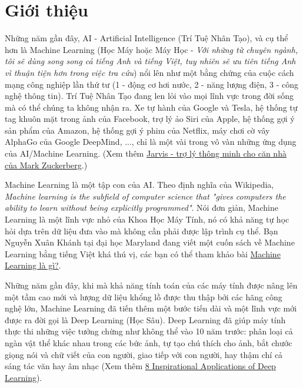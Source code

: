 
\chapter{Giới thiệu}
\label{cha:introduce}



Những năm gần đây, AI - Artificial Intelligence (Trí Tuệ Nhân Tạo), và cụ thể hơn là Machine Learning (Học Máy hoặc Máy Học - {\it Với những từ chuyên ngành, tôi sẽ dùng song song cả tiếng Anh và tiếng Việt, tuy nhiên sẽ ưu tiên tiếng Anh vì thuận tiện hơn trong việc tra cứu}) nổi lên như một bằng chứng của cuộc cách mạng công nghiệp lần thứ tư (1 - động cơ hơi nước, 2 - năng lượng điện, 3 - công nghệ thông tin). Trí Tuệ Nhân Tạo đang len lỏi vào mọi lĩnh vực trong đời sống mà có thể chúng ta không nhận ra. Xe tự hành của Google và Tesla, hệ thống tự tag khuôn mặt trong ảnh của Facebook, trợ lý ảo Siri của Apple, hệ thống gợi ý sản phẩm của Amazon, hệ thống gợi ý phim của Netflix, máy chơi cờ vây AlphaGo của Google DeepMind, ..., chỉ là một vài trong vô vàn những ứng dụng của AI/Machine Learning. (Xem thêm \href{{https://www.facebook.com/zuck/posts/10103351073024591}}{Jarvis - trợ lý thông minh cho căn nhà của Mark Zuckerberg}.)



Machine Learning là một tập con của AI. Theo định nghĩa của Wikipedia, {\it Machine learning is the subfield of computer science that "gives computers the ability to learn without being explicitly programmed"}. Nói đơn giản, Machine Learning là một lĩnh vực nhỏ của Khoa Học Máy Tính, nó có khả năng tự học hỏi dựa trên dữ liệu đưa vào mà không cần phải được lập trình cụ thể. Bạn Nguyễn Xuân Khánh tại đại học Maryland đang viết một cuốn sách về Machine Learning bằng tiếng Việt khá thú vị, các bạn có thể tham khảo bài \href{https://ml-book-vn.khanhxnguyen.com/intro.html}{Machine Learning là gì?}.

Những năm gần đây, {khi mà khả năng tính toán} của các máy tính được nâng lên một tầm cao mới và lượng dữ liệu khổng lồ được thu thập bởi các hãng công nghệ lớn, Machine Learning đã tiến thêm một bước tiến dài và một lĩnh vực mới được ra đời gọi là Deep Learning (Học Sâu). Deep Learning đã giúp máy tính thực thi những việc tưởng chừng như không thể vào 10 năm trước: phân loại cả ngàn vật thể khác nhau trong các bức ảnh, tự tạo chú thích cho ảnh, bắt chước giọng nói và chữ viết của con người, giao tiếp với con người, hay thậm chí cả sáng tác văn hay âm nhạc (Xem thêm \href{{http://machinelearningmastery.com/inspirational-applications-deep-learning/}}{8 Inspirational Applications of Deep Learning}).

